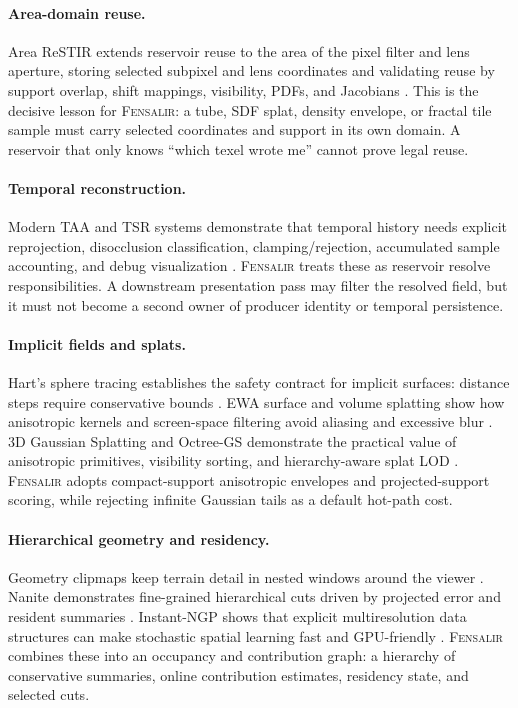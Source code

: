\documentclass[11pt]{article}
\newcommand{\Fensalir}{\textsc{Fensalir}}
\newcommand{\AreaReSTIR}{Area ReSTIR}
\newcommand{\TSR}{TSR}
\begin{document}
\paragraph{Area-domain reuse.}
\AreaReSTIR{} extends reservoir reuse to the area of the pixel filter and lens
aperture, storing selected subpixel and lens coordinates and validating reuse
by support overlap, shift mappings, visibility, PDFs, and Jacobians
\cite{zhang2024arearestir,areaRestirCode}.  This is the decisive lesson for
\Fensalir: a tube, SDF splat, density envelope, or fractal tile sample must
carry selected coordinates and support in its own domain.  A reservoir that only
knows ``which texel wrote me'' cannot prove legal reuse.

\paragraph{Temporal reconstruction.}
Modern TAA and \TSR{} systems demonstrate that temporal history needs explicit
reprojection, disocclusion classification, clamping/rejection, accumulated
sample accounting, and debug visualization \cite{unrealTSR,unrealTSRFAQ}.
\Fensalir{} treats these as reservoir resolve responsibilities.  A downstream
presentation pass may filter the resolved field, but it must not become a
second owner of producer identity or temporal persistence.

\paragraph{Implicit fields and splats.}
Hart's sphere tracing establishes the safety contract for implicit surfaces:
distance steps require conservative bounds \cite{hart1996sphere}.  EWA surface
and volume splatting show how anisotropic kernels and screen-space filtering
avoid aliasing and excessive blur \cite{zwicker2001ewa,ren2002objectewa}.
3D Gaussian Splatting and Octree-GS demonstrate the practical value of
anisotropic primitives, visibility sorting, and hierarchy-aware splat LOD
\cite{kerbl2023gaussian,ren2024octreegs}.  \Fensalir{} adopts compact-support
anisotropic envelopes and projected-support scoring, while rejecting infinite
Gaussian tails as a default hot-path cost.

\paragraph{Hierarchical geometry and residency.}
Geometry clipmaps keep terrain detail in nested windows around the viewer
\cite{losasso2004geometry,asirvatham2005gpuclipmaps}.  Nanite demonstrates
fine-grained hierarchical cuts driven by projected error and resident summaries
\cite{karis2021nanite}.  Instant-NGP shows that explicit multiresolution data
structures can make stochastic spatial learning fast and GPU-friendly
\cite{mueller2022instantngp}.  \Fensalir{} combines these into an occupancy and
contribution graph: a hierarchy of conservative summaries, online contribution
estimates, residency state, and selected cuts.
\end{document}
